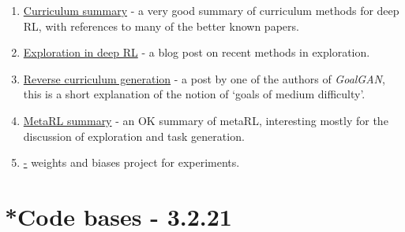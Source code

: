 \documentclass[letterpaper]{article}
\theoremstyle{definition}
\begin{document}
\begin{enumerate}
	\item 
	\href{https://lilianweng.github.io/lil-log/2020/01/29/curriculum-for-reinforcement-learning.html}{Curriculum summary} - a very good summary of curriculum methods for deep RL, with references to many of the better known papers.
	
	\item \href{https://lilianweng.github.io/lil-log/2020/06/07/exploration-strategies-in-deep-reinforcement-learning.html}{Exploration in deep RL} - a blog post on recent methods in exploration.
	
	\item 
	\href{https://bair.berkeley.edu/blog/2017/12/20/reverse-curriculum/}{Reverse curriculum generation} - a post by one of the authors of \textit{GoalGAN}, this is a short explanation of the notion of `goals of medium difficulty'.
	
	\item 
	\href{https://lilianweng.github.io/lil-log/2019/06/23/meta-reinforcement-learning.html}{MetaRL summary} - an OK summary of metaRL, interesting mostly for the discussion of exploration and task generation.
	
	\item 
	\href{https://wandb.ai/liorf/curriculum_rl} - weights and biases project for experiments.

\end{enumerate}

\section{*Code bases - 3.2.21} \label{sec:code}
\end{document}
